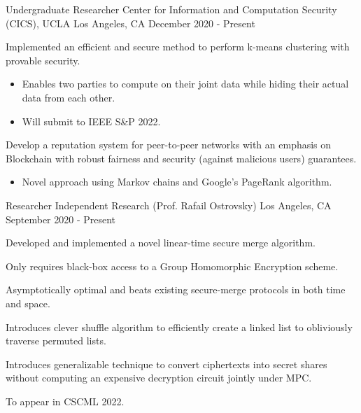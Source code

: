 \begin{cventries}
  \cventry
    {Undergraduate Researcher} %
    {Center for Information and Computation Security (CICS), UCLA} %
    {Los Angeles, CA} %
    {December 2020 - Present} %
    {
      \begin{cvitems} %
        \item{Implemented an efficient and secure method to perform k-means clustering with provable security.}
        \begin{itemize}
          \item{Enables two parties to compute on their joint data while hiding their actual data from each other.}
          \item{Will submit to IEEE S\&P 2022.}
        \end{itemize}
        \item{Develop a reputation system for peer-to-peer networks with an emphasis on Blockchain with robust fairness and security (against malicious users) guarantees.}
        \begin{itemize}
          \item{Novel approach using Markov chains and Google's PageRank algorithm.}
        \end{itemize}
      \end{cvitems}
    }

  \cventry
    {Researcher} %
    {Independent Research (Prof. Rafail Ostrovsky)} %
    {Los Angeles, CA} %
    {September 2020 - Present} %
    {
      \begin{cvitems} %
        \item{Developed and implemented a novel linear-time secure merge algorithm.}
        \item{Only requires black-box access to a Group Homomorphic Encryption scheme.}
        \item{Asymptotically optimal and beats existing secure-merge protocols in both time and space.}
        \item{Introduces clever shuffle algorithm to efficiently create a linked list to obliviously traverse permuted lists.}
        \item{Introduces generalizable technique to convert ciphertexts into secret shares without computing an expensive decryption circuit jointly under MPC.}
        \item{To appear in CSCML 2022.}
      \end{cvitems}
    }


\end{cventries}
